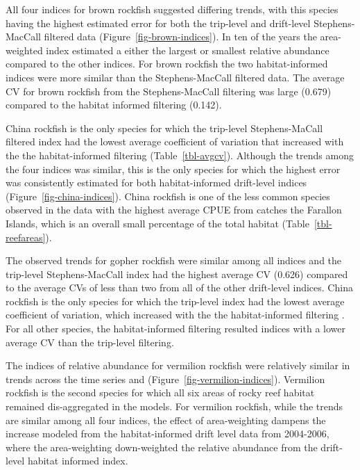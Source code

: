 \documentclass[
  12pt,
  authoryear,
  preprint,
  3p]{elsarticle}
\begin{document}
All four indices for brown rockfish suggested differing trends, with
this species having the highest estimated error for both the trip-level
and drift-level Stephens-MacCall filtered data
(Figure~\ref{fig-brown-indices}). In ten of the years the area-weighted
index estimated a either the largest or smallest relative abundance
compared to the other indices. For brown rockfish the two
habitat-informed indices were more similar than the Stephens-MacCall
filtered data. The average CV for brown rockfish from the
Stephens-MacCall filtering was large (0.679) compared to the habitat
informed filtering (0.142).

China rockfish is the only species for which the trip-level
Stephens-MaCall filtered index had the lowest average coefficient of
variation that increased with the the habitat-informed filtering
(Table~\ref{tbl-avgcv}). Although the trends among the four indices was
similar, this is the only species for which the highest error was
consistently estimated for both habitat-informed drift-level indices
(Figure~\ref{fig-china-indices}). China rockfish is one of the less
common species observed in the data with the highest average CPUE from
catches the Farallon Islands, which is an overall small percentage of
the total habitat (Table~\ref{tbl-reefareas}).

The observed trends for gopher rockfish were similar among all indices
and the trip-level Stephens-MacCall index had the highest average CV
(0.626) compared to the average CVs of less than two from all of the
other drift-level indices. China rockfish is the only species for which
the trip-level index had the lowest average coefficient of variation,
which increased with the the habitat-informed filtering . For all other
species, the habitat-informed filtering resulted indices with a lower
average CV than the trip-level filtering.

The indices of relative abundance for vermilion rockfish were relatively
similar in trends across the time series and
(Figure~\ref{fig-vermilion-indices}). Vermilion rockfish is the second
species for which all six areas of rocky reef habitat remained
dis-aggregated in the models. For vermilion rockfish, while the trends
are similar among all four indices, the effect of area-weighting dampens
the increase modeled from the habitat-informed drift level data from
2004-2006, where the area-weighting down-weighted the relative abundance
from the drift-level habitat informed index.

\FloatBarrier
\end{document}
